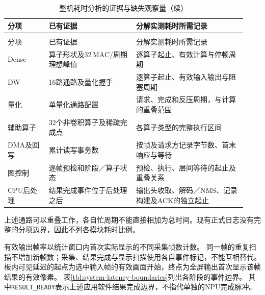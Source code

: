 \begin{reporttable}
\small
\begin{longtable}{@{}p{0.16\linewidth}p{0.34\linewidth}p{0.43\linewidth}@{}}
\caption{整机耗时分析的证据与缺失观察量}\label{tbl:system-profile-evidence}\\
\toprule
分项 & 已有证据 & 分解实测耗时所需记录 \\
\midrule
\endfirsthead
\caption[]{整机耗时分析的证据与缺失观察量（续）}\\
\toprule
分项 & 已有证据 & 分解实测耗时所需记录 \\
\midrule
\endhead
\bottomrule
\endfoot
Dense & 算子形状及32\,MAC/周期理想峰值 & 逐算子起止、有效计算与停顿周期 \\
DW & 16路通路及量化握手 & 逐算子起止、有效输入输出与阻塞周期 \\
量化 & 单量化通路配置 & 请求、完成和反压周期，与计算的重叠范围 \\
辅助算子 & 32个非卷积算子及稀疏完成点 & 各算子类型的完整执行区间 \\
DMA及回写 & 累计读写事务数 & 按帧及请求方记录字节数、首末响应与等待 \\
图控制 & 逐帧预检和阶段／算子状态 & 预检、执行、层间等待的起止及重叠关系 \\
CPU后处理 & 结果完成事件位于后处理之后 & 输出头收取、解码／NMS、记录构建及ACK的独立起止 \\
\end{longtable}
\end{reporttable}

上述通路可以重叠工作，各自忙周期不能直接相加为总时间。现有正式日志没有完整的分项边界，因此不列各模块耗时比例。

有效输出帧率以统计窗口内首次实际显示的不同采集帧数计数。
同一帧的重复扫描不增加新帧数；采集、结果完成与显示扫描使用各自事件标记，不能互相替代。
板内可见延迟的起点为选中输入帧的有效画面开始，终点为全屏输出首次显示该帧结果的有效像素。
表\ref{tbl:system-latency-boundaries}列出各阶段的事件边界。
其中\texttt{RESULT\_READY}表示上述应用软件结果完成边界，不指代单独的NPU完成脉冲。

